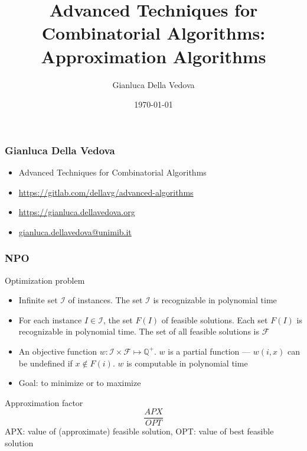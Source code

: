 \documentclass[12pt,aspectratio=169]{beamer}
\author{Gianluca Della Vedova}
\title[Advanced Algorithms]{Advanced Techniques for Combinatorial Algorithms:
Approximation Algorithms}
\institute[]{Univ. Milano--Bicocca\\
  \texttt{https://gianluca.dellavedova.org}}
\date[]{{\tiny \today\hspace{1em} \vcsShortHash}}
\begin{document}
\begin{frame}
  \titlepage
\end{frame}


\begin{frame}\frametitle{Gianluca Della Vedova}
  \begin{itemize}
  \item
                Advanced Techniques for Combinatorial Algorithms
\item
{\small\url{https://gitlab.com/dellavg/advanced-algorithms}}
  \item
{\small\url{https://gianluca.dellavedova.org}}
  \item
{\small\url{gianluca.dellavedova@unimib.it}}
  \end{itemize}
\end{frame}

\begin{frame}\frametitle{NPO}
  \begin{block}{Optimization problem}
      \begin{itemize}
  \item
    Infinite set $\mathcal{I}$ of instances.
%
    The set $\mathcal{I}$ is recognizable in polynomial time
  \item
    For each instance $I\in\mathcal{I}$, the set $F(I)$ of feasible solutions.
%
    Each set $F(I)$ is recognizable in polynomial time.
%
    The set of all feasible solutions is $\mathcal{F}$
  \item
    An objective function $w: \mathcal{I} \times \mathcal{F}\mapsto \mathbb{Q}^{+}$.
%
    $w$ is a partial function --- $w(i,x)$ can be undefined if $x\notin F(i)$.
%
    $w$ is computable in polynomial time
  \item
    Goal: to minimize or to maximize
  \end{itemize}
\end{block}
\begin{block}{Approximation factor}
  $$\frac{APX}{OPT}$$
  APX: value of (approximate) feasible solution, OPT: value of best feasible solution
  \end{block}
\end{frame}
\end{document}
